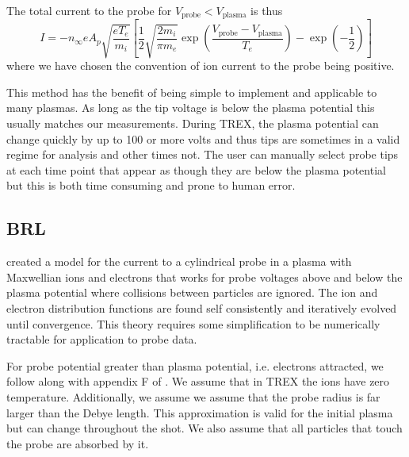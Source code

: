 The total current to the probe for $V_\text{probe} < V_\text{plasma}$ is thus
\begin{equation}
    I = -n_\infty e A_p \sqrt{\frac{e T_e}{m_i}} \left[ \frac{1}{2} \sqrt{\frac{2 m_i}{\pi m_e}} \exp\left(\frac{V_\text{probe} - V_\text{plasma}}{T_e}\right) - \exp\left(-\frac{1}{2}\right)\right] %
    \label{eq:multitip_hutchinson_model}
\end{equation}
where we have chosen the convention of ion current to the probe being positive.


This method has the benefit of being simple to implement and applicable to many plasmas. As long as the tip voltage is below the plasma potential this usually matches our measurements. During TREX, the plasma potential can change quickly by up to 100 or more volts and thus tips are sometimes in a valid regime for analysis and other times not. The user can manually select probe tips at each time point that appear as though they are below the plasma potential but this is both time consuming and prone to human error.

\subsection{BRL}
\label{sss:multitip_brl_theory}

\cite{Laframboise_1966} created a model for the current to a cylindrical probe in a plasma with Maxwellian ions and electrons that works for probe voltages above and below the plasma potential where collisions between particles are ignored. The ion and electron distribution functions are found self consistently and iteratively evolved until convergence. This theory requires some simplification to be numerically tractable for application to probe data.

For probe potential greater than plasma potential, i.e. electrons attracted, we follow along with appendix F of \cite{Laframboise_1966}. We assume that in TREX the ions have zero temperature. Additionally, we assume we assume that the probe radius is far larger than the Debye length. This approximation is valid for the initial plasma but can change throughout the shot. We also assume that all particles that touch the probe are absorbed by it.

